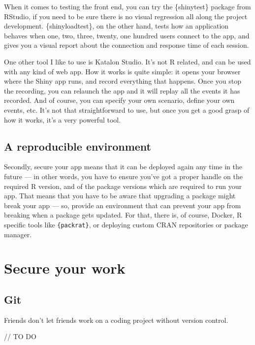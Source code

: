 \documentclass[]{book}
\begin{document}
When it comes to testing the front end, you can try the \{shinytest\} package from RStudio, if you need to be sure there is no visual regression all along the project development. \{shinyloadtest\}, on the other hand, tests how an application behaves when one, two, three, twenty, one hundred users connect to the app, and gives you a visual report about the connection and response time of each session.

One other tool I like to use is Katalon Studio. It's not R related, and can be used with any kind of web app. How it works is quite simple: it opens your browser where the Shiny app runs, and record everything that happens. Once you stop the recording, you can relaunch the app and it will replay all the events it has recorded. And of course, you can specify your own scenario, define your own events, etc. It's not that straightforward to use, but once you get a good grasp of how it works, it's a very powerful tool.

\hypertarget{a-reproducible-environment}{%
\section{A reproducible environment}\label{a-reproducible-environment}}

Secondly, secure your app means that it can be deployed again any time in the future --- in other words, you have to ensure you've got a proper handle on the required R version, and of the package versions which are required to run your app. That means that you have to be aware that upgrading a package might break your app --- so, provide an environment that can prevent your app from breaking when a package gets updated. For that, there is, of course, Docker, R specific tools like \texttt{\{packrat\}}, or deploying custom CRAN repositories or package manager.

\hypertarget{secure}{%
\chapter{Secure your work}\label{secure}}

\hypertarget{git}{%
\section{Git}\label{git}}

Friends don't let friends work on a coding project without version control.

// TO DO
\end{document}

